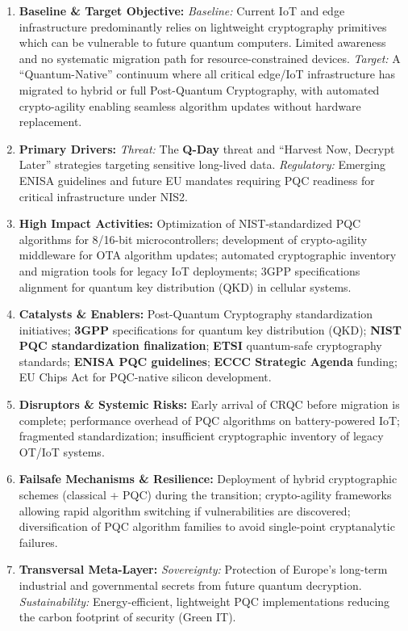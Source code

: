 \documentclass{ieeeaccess}
\begin{document}
\begin{enumerate}
\item \textbf{Baseline \& Target Objective:}
\textit{Baseline:} Current IoT and edge infrastructure predominantly relies on lightweight cryptography primitives which can be vulnerable to future quantum computers. Limited awareness and no systematic migration path for resource-constrained devices.
\textit{Target:} A ``Quantum-Native'' continuum where all critical edge/IoT infrastructure has migrated to hybrid or full Post-Quantum Cryptography, with automated crypto-agility enabling seamless algorithm updates without hardware replacement.

\item \textbf{Primary Drivers:} 
\textit{Threat:} The \textbf{Q-Day} threat and ``Harvest Now, Decrypt Later'' strategies targeting sensitive long-lived data.
\textit{Regulatory:} Emerging ENISA guidelines and future EU mandates requiring PQC readiness for critical infrastructure under NIS2.

\item \textbf{High Impact Activities:} 
Optimization of NIST-standardized PQC algorithms for 8/16-bit microcontrollers; development of crypto-agility middleware for OTA algorithm updates; automated cryptographic inventory and migration tools for legacy IoT deployments; 3GPP specifications alignment for quantum key distribution (QKD) in cellular systems.

\item \textbf{Catalysts \& Enablers:} Post-Quantum Cryptography standardization initiatives; \textbf{3GPP} specifications for quantum key distribution (QKD); \textbf{NIST PQC standardization finalization}; \textbf{ETSI} quantum-safe cryptography standards; \textbf{ENISA PQC guidelines}; \textbf{ECCC Strategic Agenda} funding; EU Chips Act for PQC-native silicon development.

\item \textbf{Disruptors \& Systemic Risks:} 
Early arrival of CRQC before migration is complete; performance overhead of PQC algorithms on battery-powered IoT; fragmented standardization; insufficient cryptographic inventory of legacy OT/IoT systems.

\item \textbf{Failsafe Mechanisms \& Resilience:} 
Deployment of hybrid cryptographic schemes (classical + PQC) during the transition; crypto-agility frameworks allowing rapid algorithm switching if vulnerabilities are discovered; diversification of PQC algorithm families to avoid single-point cryptanalytic failures.

\item \textbf{Transversal Meta-Layer:} 
\textit{Sovereignty:} Protection of Europe's long-term industrial and governmental secrets from future quantum decryption. \textit{Sustainability:} Energy-efficient, lightweight PQC implementations reducing the carbon footprint of security (Green IT).

\end{enumerate}
\end{document}
